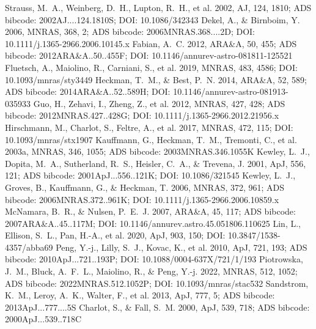 \documentclass[twocolumn]{aastex631}
\begin{document}
\begin{thebibliography}{}
 Strauss, M.~A., Weinberg, D.~H., Lupton, R.~H., et al. 2002, AJ, 124, 1810; ADS bibcode: 2002AJ....124.1810S; DOI: 10.1086/342343
 Dekel, A., \& Birnboim, Y. 2006, MNRAS, 368, 2; ADS bibcode: 2006MNRAS.368....2D; DOI: 10.1111/j.1365-2966.2006.10145.x
 Fabian, A.~C. 2012, ARA\&A, 50, 455; ADS bibcode: 2012ARA\&A..50..455F; DOI: 10.1146/annurev-astro-081811-125521
 Fluetsch, A., Maiolino, R., Carniani, S., et al. 2019, MNRAS, 483, 4586; DOI: 10.1093/mnras/sty3449
 Heckman, T.~M., \& Best, P.~N. 2014, ARA\&A, 52, 589; ADS bibcode: 2014ARA\&A..52..589H; DOI: 10.1146/annurev-astro-081913-035933
 Guo, H., Zehavi, I., Zheng, Z., et al. 2012, MNRAS, 427, 428; ADS bibcode: 2012MNRAS.427..428G; DOI: 10.1111/j.1365-2966.2012.21956.x
 Hirschmann, M., Charlot, S., Feltre, A., et al. 2017, MNRAS, 472, 115; DOI: 10.1093/mnras/stx1907
 Kauffmann, G., Heckman, T.~M., Tremonti, C., et al. 2003a, MNRAS, 346, 1055; ADS bibcode: 2003MNRAS.346.1055K
 Kewley, L.~J., Dopita, M.~A., Sutherland, R.~S., Heisler, C.~A., \& Trevena, J. 2001, ApJ, 556, 121; ADS bibcode: 2001ApJ...556..121K; DOI: 10.1086/321545
 Kewley, L.~J., Groves, B., Kauffmann, G., \& Heckman, T. 2006, MNRAS, 372, 961; ADS bibcode: 2006MNRAS.372..961K; DOI: 10.1111/j.1365-2966.2006.10859.x
 McNamara, B.~R., \& Nulsen, P.~E.~J. 2007, ARA\&A, 45, 117; ADS bibcode: 2007ARA\&A..45..117M; DOI: 10.1146/annurev.astro.45.051806.110625
 Lin, L., Ellison, S.~L., Pan, H.-A., et al. 2020, ApJ, 903, 150; DOI: 10.3847/1538-4357/abba69
 Peng, Y.-j., Lilly, S.~J., Kovac, K., et al. 2010, ApJ, 721, 193; ADS bibcode: 2010ApJ...721..193P; DOI: 10.1088/0004-637X/721/1/193
 Piotrowska, J.~M., Bluck, A.~F.~L., Maiolino, R., \& Peng, Y.-j. 2022, MNRAS, 512, 1052; ADS bibcode: 2022MNRAS.512.1052P; DOI: 10.1093/mnras/stac532
 Sandstrom, K.~M., Leroy, A.~K., Walter, F., et al. 2013, ApJ, 777, 5; ADS bibcode: 2013ApJ...777....5S
 Charlot, S., \& Fall, S.~M. 2000, ApJ, 539, 718; ADS bibcode: 2000ApJ...539..718C

\end{thebibliography}
\end{document}
